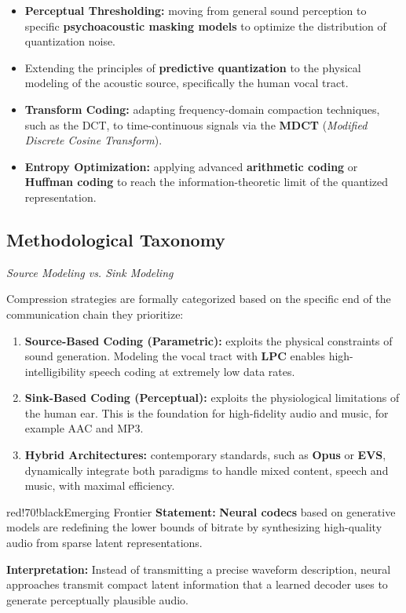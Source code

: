 \begin{itemize}
\item \textbf{Perceptual Thresholding:} moving from general sound perception to specific \textbf{psychoacoustic masking models} to optimize the distribution of quantization noise.
\item Extending the principles of \textbf{predictive quantization} to the physical modeling of the acoustic source, specifically the human vocal tract.
\item \textbf{Transform Coding:} adapting frequency-domain compaction techniques, such as the DCT, to time-continuous signals via the \textbf{MDCT} (\textit{Modified Discrete Cosine Transform}).
\item \textbf{Entropy Optimization:} applying advanced \textbf{arithmetic coding} or \textbf{Huffman coding} to reach the information-theoretic limit of the quantized representation.
\end{itemize}

\subsection{Methodological Taxonomy}

\textit{Source Modeling vs. Sink Modeling}

Compression strategies are formally categorized based on the specific end of the communication chain they prioritize:

\begin{enumerate}
\item \textbf{Source-Based Coding (Parametric):} exploits the physical constraints of sound generation. Modeling the vocal tract with \textbf{LPC} enables high-intelligibility speech coding at extremely low data rates.
\item \textbf{Sink-Based Coding (Perceptual):} exploits the physiological limitations of the human ear. This is the foundation for high-fidelity audio and music, for example AAC and MP3.
\item \textbf{Hybrid Architectures:} contemporary standards, such as \textbf{Opus} or \textbf{EVS}, dynamically integrate both paradigms to handle mixed content, speech and music, with maximal efficiency.
\end{enumerate}

\begin{calloutbox}{red!70!black}{Emerging Frontier}
\textbf{Statement:} \textbf{Neural codecs} based on generative models are redefining the lower bounds of bitrate by synthesizing high-quality audio from sparse latent representations.

\textbf{Interpretation:} Instead of transmitting a precise waveform description, neural approaches transmit compact latent information that a learned decoder uses to generate perceptually plausible audio.
\end{calloutbox}

